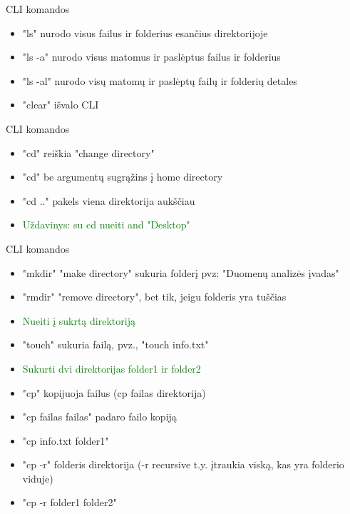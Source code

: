 \documentclass[11pt,xcolor=table]{beamer}
\begin{document}
\begin{frame}{CLI komandos}
\begin{itemize}
\item "ls" nurodo visus failus ir folderius esančius direktorijoje
\item "ls -a" nurodo visus matomus ir paslėptus failus ir folderius
\item "ls -al" nurodo visų matomų ir paslėptų failų ir folderių detales
\item "clear" išvalo CLI
\end{itemize}
\end{frame}


\begin{frame}{CLI komandos}
\begin{itemize}
\item "cd"  reiškia "change directory"
\item "cd"  be argumentų sugrąžins į home directory
\item "cd .." pakels viena direktorija aukščiau
\item \textcolor{green}{Uždavinys: su cd nueiti and "Desktop"}
\end{itemize}
\end{frame}

\begin{frame}{CLI komandos}
\begin{itemize}
\item "mkdir" "make directory"  sukuria folderį pvz: "Duomenų analizės įvadas"
\item "rmdir" "remove directory", bet tik, jeigu folderis yra tuščias
\item \textcolor{green}{Nueiti į sukrtą direktoriją}
\item "touch" sukuria failą, pvz., "touch info.txt"
\item \textcolor{green}{Sukurti dvi direktorijas folder1 ir folder2}
\item "cp" kopijuoja failus (cp failas direktorija)
\item "cp failas failas" padaro failo kopiją
\item "cp info.txt folder1"
\item "cp -r" folderis direktorija (-r recursive t.y. įtraukia viską, kas yra folderio viduje)
\item "cp -r folder1 folder2"
\end{itemize}
\end{frame}
\end{document}
